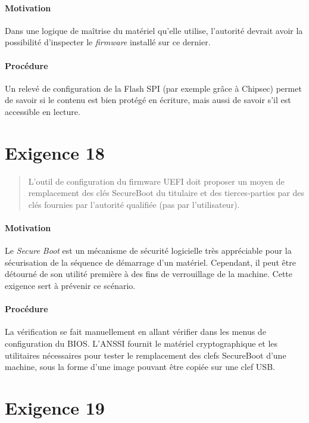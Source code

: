 \documentclass{report}
\begin{document}
\paragraph{Motivation}
%
Dans une logique de maîtrise du matériel qu’elle utilise, l’autorité devrait
avoir la possibilité d’inspecter le \emph{firmware} installé sur ce dernier.

\paragraph{Procédure}
%
Un relevé de configuration de la Flash SPI (par exemple grâce à Chipsec) permet
de savoir si le contenu est bien protégé en écriture, mais aussi de savoir s’il
est accessible en lecture.

\section{Exigence 18}

\begin{quote}
  L’outil de configuration du firmware UEFI doit proposer un moyen de
  remplacement des clés SecureBoot du titulaire et des tierces-parties par des
  clés fournies par l’autorité qualifiée (pas par l’utilisateur).
\end{quote}

\paragraph{Motivation}
%
Le \emph{Secure Boot} est un mécanisme de sécurité logicielle très appréciable
pour la sécurisation de la séquence de démarrage d’un matériel.
%
Cependant, il peut être détourné de son utilité première à des fins de
verrouillage de la machine.
%
Cette exigence sert à prévenir ce scénario.

\paragraph{Procédure}
%
La vérification se fait manuellement en allant vérifier dans les menus de
configuration du BIOS.
%
L’ANSSI fournit le matériel cryptographique et les utilitaires nécessaires pour
tester le remplacement des clefs SecureBoot d’une machine, sous la forme d’une
image pouvant être copiée sur une clef USB.

\section{Exigence 19}
\end{document}
